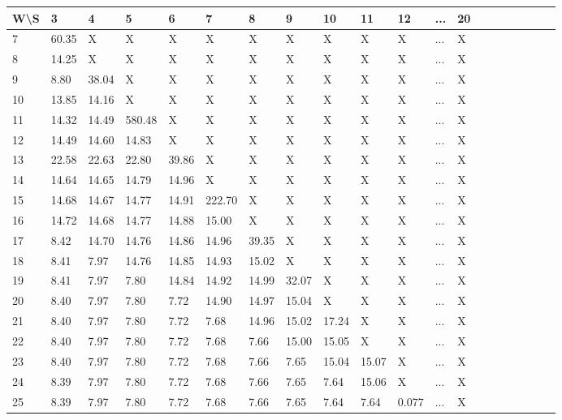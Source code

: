 \documentclass{article}
\begin{document}
\begin{table}[H]
\begin{adjustwidth}{-.7in}{-.7in} 
\begin{tabular}{|l|l|l|l|l|l|l|l|l|l|l|l|l|l|l|l|l|l|l|l|}
\hline
W\textbackslash{}S & 3 & 4 & 5 & 6 & 7 & 8 & 9 & 10 & 11 & 12 & ... & 20 \\ \hline
7 & 60.35 & X & X & X & X & X & X & X & X & X & ... & X \\ \hline
8 & 14.25 & X & X & X & X & X & X & X & X & X & ... & X \\ \hline
9 & 8.80 & 38.04 & X & X & X & X & X & X & X & X & ... & X \\ \hline
10 & 13.85 & 14.16 & X & X & X & X & X & X & X & X & ... & X \\ \hline
11 & 14.32 & 14.49 & 580.48 & X & X & X & X & X & X & X & ... & X \\ \hline
12 & 14.49 & 14.60 & 14.83 & X & X & X & X & X & X & X & ... & X \\ \hline
13 & 22.58 & 22.63 & 22.80 & 39.86 & X & X & X & X & X & X & ... & X \\ \hline
14 & 14.64 & 14.65 & 14.79 & 14.96 & X & X & X & X & X & X & ... & X \\ \hline
15 & 14.68 & 14.67 & 14.77 & 14.91 & 222.70 & X & X & X & X & X & ... & X \\ \hline
16 & 14.72 & 14.68 & 14.77 & 14.88 & 15.00 & X & X & X & X & X & ... & X \\ \hline
17 & 8.42 & 14.70 & 14.76 & 14.86 & 14.96 & 39.35 & X & X & X & X & ... & X \\ \hline
18 & 8.41 & 7.97 & 14.76 & 14.85 & 14.93 & 15.02 & X & X & X & X & ... & X \\ \hline
19 & 8.41 & 7.97 & 7.80 & 14.84 & 14.92 & 14.99 & 32.07 & X & X & X & ... & X \\ \hline
20 & 8.40 & 7.97 & 7.80 & 7.72 & 14.90 & 14.97 & 15.04 & X & X & X & ... & X \\ \hline
21 & 8.40 & 7.97 & 7.80 & 7.72 & 7.68 & 14.96 & 15.02 & 17.24 & X & X & ... & X \\ \hline
22 & 8.40 & 7.97 & 7.80 & 7.72 & 7.68 & 7.66 & 15.00 & 15.05 & X & X & ... & X \\ \hline
23 & 8.40 & 7.97 & 7.80 & 7.72 & 7.68 & 7.66 & 7.65 & 15.04 & 15.07 & X & ... & X \\ \hline
24 & 8.39 & 7.97 & 7.80 & 7.72 & 7.68 & 7.66 & 7.65 & 7.64 & 15.06 & X & ... & X \\ \hline
25 & 8.39 & 7.97 & 7.80 & 7.72 & 7.68 & 7.66 & 7.65 & 7.64 & 7.64 & 0.077 & ... & X \\ \hline

\end{tabular}
\end{adjustwidth}
\end{table}
\end{document}

